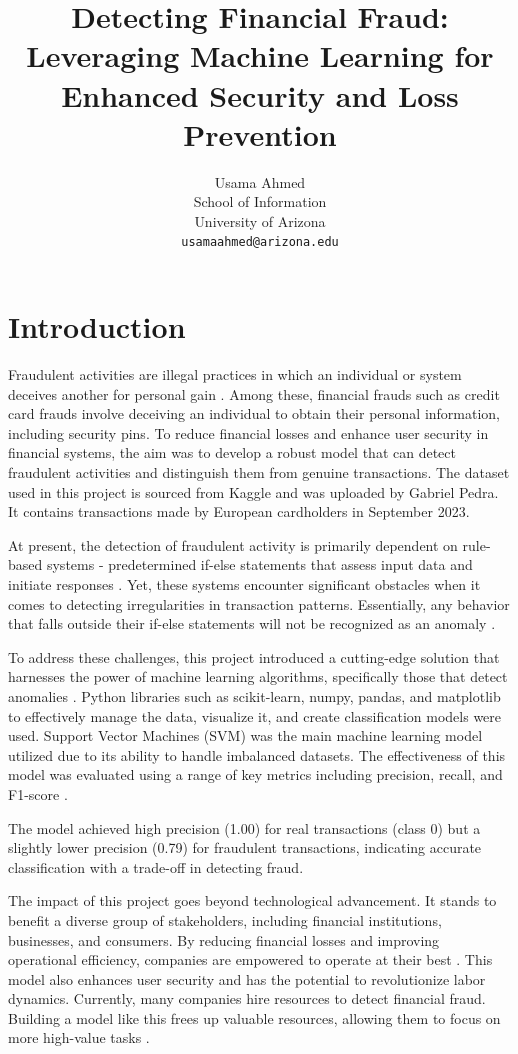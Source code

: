 \documentclass[11pt,article,oneside]{article}
\title{Detecting Financial Fraud: Leveraging Machine Learning for
Enhanced Security and Loss Prevention}
\author{
    Usama Ahmed\\
    School of Information \\
    University of Arizona\\
    \texttt{usamaahmed@arizona.edu}
}
\begin{document}
\maketitle

\section{Introduction}

Fraudulent activities are illegal practices in which an individual or system deceives another for personal gain \cite{fraud1}. 
Among these, financial frauds such as credit card frauds involve deceiving an individual to obtain their personal information, 
including security pins. To reduce financial losses and enhance user security in financial systems, the aim was to develop a robust 
model that can detect fraudulent activities and distinguish them from genuine transactions. The dataset \cite{dataset} used in this 
project is sourced from Kaggle and was uploaded by Gabriel Pedra. It contains transactions made by European cardholders in September
2023.

At present, the detection of fraudulent activity is primarily dependent on rule-based systems - predetermined if-else statements
that assess input data and initiate responses \cite{7735}. Yet, these systems encounter significant obstacles when it comes
to detecting irregularities in transaction patterns. Essentially, any behavior that falls outside their if-else statements 
will not be recognized as an anomaly \cite{7735}.  

To address these challenges, this project introduced a cutting-edge solution that harnesses the power of machine learning 
algorithms, specifically those that detect anomalies \cite{c2}. Python libraries such as scikit-learn, numpy, pandas, and matplotlib 
to effectively manage the data, visualize it, and create classification models were used. Support Vector Machines (SVM) was  
the main machine learning model utilized due to its ability to handle imbalanced datasets. The effectiveness of this model was
evaluated using a range of key metrics including precision, recall, and F1-score \cite{c2}.

The model achieved high precision (1.00) for real transactions (class 0) but a slightly lower precision (0.79) for 
fraudulent transactions, indicating accurate classification with a trade-off in detecting fraud.

The impact of this project goes beyond technological advancement. It stands to benefit a diverse group of stakeholders, 
including financial institutions, businesses, and consumers. By reducing financial losses and improving operational efficiency, 
companies are empowered to operate at their best \cite{7735}. This model also enhances user security and has the potential to 
revolutionize labor dynamics. Currently, many companies hire resources to detect financial fraud. Building a model 
like this frees up valuable resources, allowing them to focus on more high-value tasks \cite{7735}.
\end{document}
